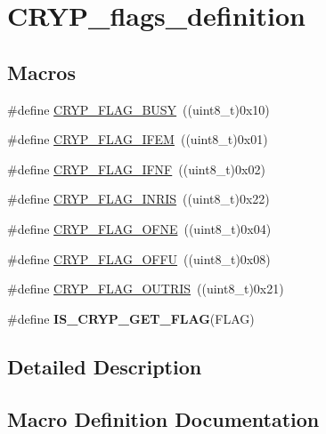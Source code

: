 \hypertarget{group___c_r_y_p__flags__definition}{}\section{C\+R\+Y\+P\+\_\+flags\+\_\+definition}
\label{group___c_r_y_p__flags__definition}
\subsection*{Macros}
\begin{DoxyCompactItemize}
\item 
\#define \hyperlink{group___c_r_y_p__flags__definition_ga701f57afbf29f56f57eadc76835008ce}{C\+R\+Y\+P\+\_\+\+F\+L\+A\+G\+\_\+\+B\+U\+S\+Y}~((uint8\+\_\+t)0x10)
\item 
\#define \hyperlink{group___c_r_y_p__flags__definition_gac595f461b1eae355a5f22c6ddbb6b795}{C\+R\+Y\+P\+\_\+\+F\+L\+A\+G\+\_\+\+I\+F\+E\+M}~((uint8\+\_\+t)0x01)
\item 
\#define \hyperlink{group___c_r_y_p__flags__definition_ga0c5c1eb9236f373c522cbc407b18b7dd}{C\+R\+Y\+P\+\_\+\+F\+L\+A\+G\+\_\+\+I\+F\+N\+F}~((uint8\+\_\+t)0x02)
\item 
\#define \hyperlink{group___c_r_y_p__flags__definition_gae78eb0d13fa041688f4b33479b632232}{C\+R\+Y\+P\+\_\+\+F\+L\+A\+G\+\_\+\+I\+N\+R\+I\+S}~((uint8\+\_\+t)0x22)
\item 
\#define \hyperlink{group___c_r_y_p__flags__definition_gaa0810704152c5810a2461acdec0cf13d}{C\+R\+Y\+P\+\_\+\+F\+L\+A\+G\+\_\+\+O\+F\+N\+E}~((uint8\+\_\+t)0x04)
\item 
\#define \hyperlink{group___c_r_y_p__flags__definition_ga6dd1f9ebfe8658ade0855f34607e0a6b}{C\+R\+Y\+P\+\_\+\+F\+L\+A\+G\+\_\+\+O\+F\+F\+U}~((uint8\+\_\+t)0x08)
\item 
\#define \hyperlink{group___c_r_y_p__flags__definition_gae6f06dee9a989cfc664be879fed2ded2}{C\+R\+Y\+P\+\_\+\+F\+L\+A\+G\+\_\+\+O\+U\+T\+R\+I\+S}~((uint8\+\_\+t)0x21)
\item 
\#define {\bfseries I\+S\+\_\+\+C\+R\+Y\+P\+\_\+\+G\+E\+T\+\_\+\+F\+L\+A\+G}(F\+L\+A\+G)
\end{DoxyCompactItemize}


\subsection{Detailed Description}


\subsection{Macro Definition Documentation}
\hypertarget{group___c_r_y_p__flags__definition_ga701f57afbf29f56f57eadc76835008ce}{}
